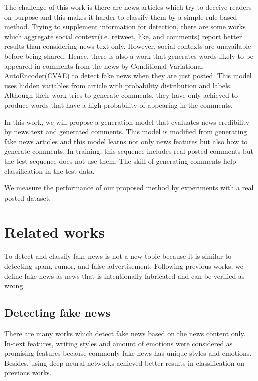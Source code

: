 \documentclass[conference]{IEEEtran}
\begin{document}
The challenge of this work is there are news articles which try to deceive readers on purpose
and this makes it harder to classify them by a simple rule-based method.
Trying to supplement information for detection,
there are some works which aggregate social context(i.e. retweet, like, and comments)
report better results than considering news text only\cite{Guo:2018:RDH:3269206.3271709}.
However, social contexts are unavailable before being shared.
Hence, there is also a work that generates words likely to be appeared in comments from the news by Conditional Variational AutoEncoder(CVAE) to detect fake news when they are just posted\cite{ijcai2018-533}.
This model uses hidden variables from article with probability distribution and labels.
Although their work tries to generate comments, they have only achieved to produce words that have a high probability of appearing in the comments.

In this work, we will propose a generation model that evaluates news credibility by news text and generated comments.
This model is modified from generating fake news articles\cite{NIPS2019_9106} and this model learns not only news features but also how to generate comments.
In training, this sequence includes real posted comments but the test sequence does not use them.
The skill of generating comments help classification in the test data.

We measure the performance of our proposed method by experiments with a real posted dataset.


\section{Related works}
To detect and classify fake news is not a new topic because it is similar to detecting spam\cite{shen2017discovering}, rumor\cite{7023340}, and false advertisement\cite{Huang:2017:DFO:3041021.3054233}.
Following previous works\cite{Shu:2017:FND:3137597.3137600,Ruchansky:2017:CHD:3132847.3132877,Wang:2018:EEA:3219819.3219903},
we define fake news as news that is intentionally fabricated and can be verified as wrong.

\subsection{Detecting fake news}
There are many works which detect fake news based on the news content only.
In-text features, writing styles\cite{DBLP:journals/corr/PotthastKRBS17} and amount of emotions\cite{DBLP:journals/corr/abs-1903-01728}
were considered as promising features because commonly fake news has unique styles and emotions.
Besides, using deep neural networks achieved better results in classification on previous works\cite{wang-2017-liar,karimi-tang-2019-learning,karimi-etal-2018-multi}.
\end{document}
